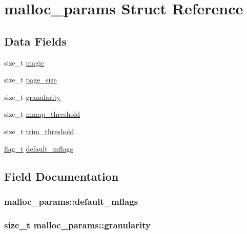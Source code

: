 \hypertarget{structmalloc__params}{}\section{malloc\+\_\+params Struct Reference}
\label{structmalloc__params}
\subsection*{Data Fields}
\begin{DoxyCompactItemize}
\item 
size\+\_\+t \hyperlink{structmalloc__params_a7034fc9c71af2cc5ba9cd079effdf5a8}{magic}
\item 
size\+\_\+t \hyperlink{structmalloc__params_a3b7a605d7ebe148a8fb3051465dc3979}{page\+\_\+size}
\item 
size\+\_\+t \hyperlink{structmalloc__params_aa0609453d9ec826c8ffc632cbfb8cf68}{granularity}
\item 
size\+\_\+t \hyperlink{structmalloc__params_a5b2af958efc37d52cfa905bc98b41e1b}{mmap\+\_\+threshold}
\item 
size\+\_\+t \hyperlink{structmalloc__params_accae9b2bcb4df63efcdc0b18826cc578}{trim\+\_\+threshold}
\item 
\hyperlink{dl__malloc_8c_a98d45780d5103f1a6b54a549a3d12de2}{flag\+\_\+t} \hyperlink{structmalloc__params_a0bd6b4819a5d7c629c5ab56262f6296d}{default\+\_\+mflags}
\end{DoxyCompactItemize}


\subsection{Field Documentation}
\subsubsection[{\texorpdfstring{default\+\_\+mflags}{default_mflags}}]{ malloc\+\_\+params\+::default\+\_\+mflags}\hypertarget{structmalloc__params_a0bd6b4819a5d7c629c5ab56262f6296d}{}\label{structmalloc__params_a0bd6b4819a5d7c629c5ab56262f6296d}
\subsubsection[{\texorpdfstring{granularity}{granularity}}]{\setlength{\rightskip}{0pt plus 5cm}size\+\_\+t malloc\+\_\+params\+::granularity}\hypertarget{structmalloc__params_aa0609453d9ec826c8ffc632cbfb8cf68}{}\label{structmalloc__params_aa0609453d9ec826c8ffc632cbfb8cf68}
